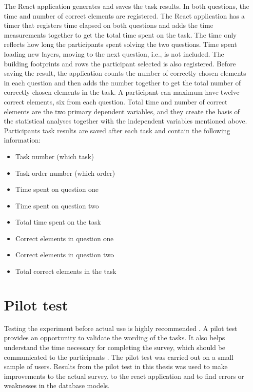 The React application generates and saves the task results. In both questions, the time and number of correct elements are registered. The React application has a timer that registers time elapsed on both questions and adds the time measurements together to get the total time spent on the task. The time only reflects how long the participants spent solving the two questions. Time spent loading new layers, moving to the next question, i.e., is not included. The building footprints and rows the participant selected is also registered. Before saving the result, the application counts the number of correctly chosen elements in each question and then adds the number together to get the total number of correctly chosen elements in the task. A participant can maximum have twelve correct elements, six from each question. Total time and number of correct elements are the two primary dependent variables, and they create the basis of the statistical analyses together with the independent variables mentioned above. Participants task results are saved after each task and contain the following information:

\begin{itemize}
	\item Task number (which task)
	\item Task order number (which order)
	\item Time spent on question one 
	\item Time spent on question two
	\item Total time spent on the task
	\item Correct elements in question one
	\item Correct elements in question two
	\item Total correct elements in the task
\end{itemize}
\vspace{0.2cm}

\section{Pilot test}
Testing the experiment before actual use is highly recommended \citep{Ben2009}. A pilot test provides an opportunity to validate the wording of the tasks. It also helps understand the time necessary for completing the survey, which should be communicated to the participants \citep{Schade2015}. The pilot test was carried out on a small sample of users. Results from the pilot test in this thesis was used to make improvements to the actual survey, to the react application and to find errors or weaknesses in the database models.

